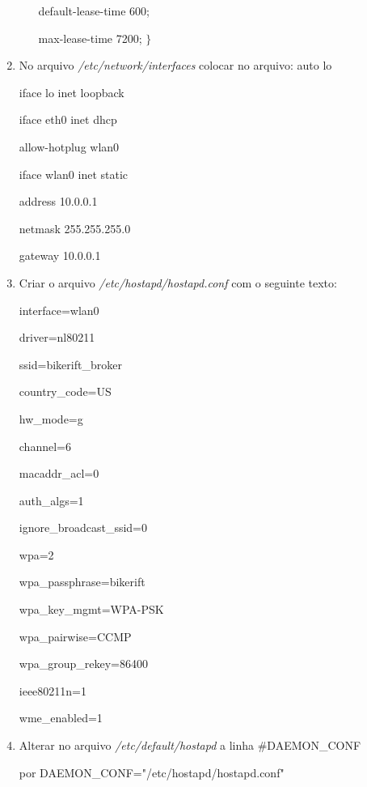 \begin{enumerate}
\begin{itemize}
                \hspace*{6mm}    default-lease-time 600;
                
                \hspace*{6mm}    max-lease-time 7200;
                $\}$
        \end{itemize}
    \item No arquivo \textit{/etc/network/interfaces} colocar no arquivo:
        auto lo
        
        iface lo inet loopback
        
        iface eth0 inet dhcp
        
        allow-hotplug wlan0
        
        iface wlan0 inet static
        
            \hspace*{6mm} address 10.0.0.1
        
            \hspace*{6mm} netmask 255.255.255.0
        
	    \hspace*{6mm} gateway 10.0.0.1

    \item Criar o arquivo \textit{/etc/hostapd/hostapd.conf} com o seguinte texto:

        interface=wlan0

        driver=nl80211

        ssid=bikerift\_broker

        country\_code=US

        hw\_mode=g

        channel=6

        macaddr\_acl=0

        auth\_algs=1

        ignore\_broadcast\_ssid=0

        wpa=2

        wpa\_passphrase=bikerift 

        wpa\_key\_mgmt=WPA-PSK

        wpa\_pairwise=CCMP

        wpa\_group\_rekey=86400

        ieee80211n=1

        wme\_enabled=1

    \item Alterar no arquivo \textit{/etc/default/hostapd} a linha #DAEMON\_CONF 

por DAEMON\_CONF="/etc/hostapd/hostapd.conf"


\end{enumerate}
